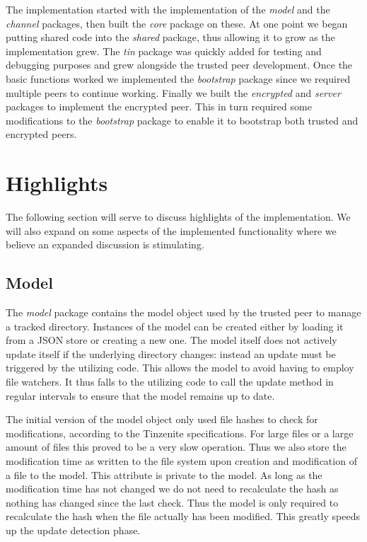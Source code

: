 The implementation started with the implementation of the \emph{model} and the \emph{channel} packages, then built the \emph{core} package on these.
At one point we began putting shared code into the \emph{shared} package, thus allowing it to grow as the implementation grew.
The \emph{tin} package was quickly added for testing and debugging purposes and grew alongside the trusted peer development.
Once the basic functions worked we implemented the \emph{bootstrap} package since we required multiple peers to continue working.
Finally we built the \emph{encrypted} and \emph{server} packages to implement the encrypted peer.
This in turn required some modifications to the \emph{bootstrap} package to enable it to bootstrap both trusted and encrypted peers.

\section{Highlights}
\label{sec:Highlights}

The following section will serve to discuss highlights of the implementation.
We will also expand on some aspects of the implemented functionality where we believe an expanded discussion is stimulating.

\subsection{Model}
\label{sub:Model}

The \emph{model} package contains the model object used by the trusted peer to manage a tracked directory.
Instances of the model can be created either by loading it from a JSON store or creating a new one.
The model itself does not actively update itself if the underlying directory changes: instead an update must be triggered by the utilizing code.
This allows the model to avoid having to employ file watchers.
It thus falls to the utilizing code to call the update method in regular intervals to ensure that the model remains up to date.

The initial version of the model object only used file hashes to check for modifications, according to the Tinzenite specifications.
For large files or a large amount of files this proved to be a very slow operation.
Thus we also store the modification time as written to the file system upon creation and modification of a file to the model.
This attribute is private to the model.
As long as the modification time has not changed we do not need to recalculate the hash as nothing has changed since the last check.
Thus the model is only required to recalculate the hash when the file actually has been modified.
This greatly speeds up the update detection phase.

